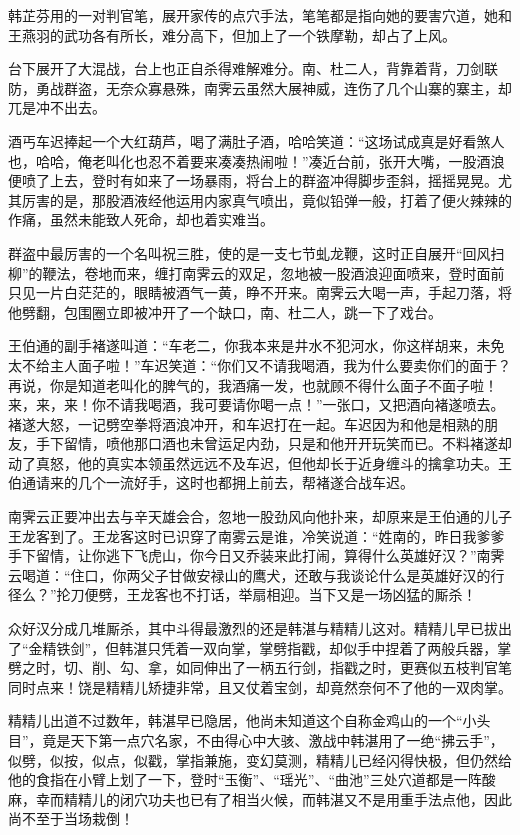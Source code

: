 \documentclass[12pt,oneside]{book}
\begin{document}
韩芷芬用的一对判官笔，展开家传的点穴手法，笔笔都是指向她的要害穴道，她和王燕羽的武功各有所长，难分高下，但加上了一个铁摩勒，却占了上风。

台下展开了大混战，台上也正自杀得难解难分。南、杜二人，背靠着背，刀剑联防，勇战群盗，无奈众寡悬殊，南霁云虽然大展神威，连伤了几个山寨的寨主，却兀是冲不出去。

酒丐车迟捧起一个大红葫芦，喝了满肚子酒，哈哈笑道：``这场试成真是好看煞人也，哈哈，俺老叫化也忍不着要来凑凑热闹啦！''凑近台前，张开大嘴，一股酒浪便喷了上去，登时有如来了一场暴雨，将台上的群盗冲得脚步歪斜，摇摇晃晃。尤其厉害的是，那股酒液经他运用内家真气喷出，竟似铅弹一般，打着了便火辣辣的作痛，虽然未能致人死命，却也着实难当。

群盗中最厉害的一个名叫祝三胜，使的是一支七节虬龙鞭，这时正自展开``回风扫柳''的鞭法，卷地而来，缠打南霁云的双足，忽地被一股酒浪迎面喷来，登时面前只见一片白茫茫的，眼睛被酒气一黄，睁不开来。南霁云大喝一声，手起刀落，将他劈翻，包围圈立即被冲开了一个缺口，南、杜二人，跳一下了戏台。

王伯通的副手褚遂叫道：``车老二，你我本来是井水不犯河水，你这样胡来，未免太不给主人面子啦！''车迟笑道：``你们又不请我喝酒，我为什么要卖你们的面于？再说，你是知道老叫化的脾气的，我酒痛一发，也就顾不得什么面子不面子啦！来，来，来！你不请我喝酒，我可要请你喝一点！''一张口，又把酒向褚遂喷去。褚遂大怒，一记劈空拳将酒浪冲开，和车迟打在一起。车迟因为和他是相熟的朋友，手下留情，喷他那口酒也未曾运足内劲，只是和他开开玩笑而已。不料褚遂却动了真怒，他的真实本领虽然远远不及车迟，但他却长于近身缠斗的擒拿功夫。王伯通请来的几个一流好手，这时也都拥上前去，帮褚遂合战车迟。

南霁云正要冲出去与辛天雄会合，忽地一股劲风向他扑来，却原来是王伯通的儿子王龙客到了。王龙客这时已识穿了南雾云是谁，冷笑说道：``姓南的，昨日我爹爹手下留情，让你逃下飞虎山，你今日又乔装来此打闹，算得什么英雄好汉？''南霁云喝道：``住口，你两父子甘做安禄山的鹰犬，还敢与我谈论什么是英雄好汉的行径么？''抡刀便劈，王龙客也不打话，举扇相迎。当下又是一场凶猛的厮杀！

众好汉分成几堆厮杀，其中斗得最激烈的还是韩湛与精精儿这对。精精儿早已拔出了``金精铁剑''，但韩湛只凭着一双向掌，掌劈指戳，却似手中捏着了两般兵器，掌劈之时，切、削、勾、拿，如同伸出了一柄五行剑，指戳之时，更赛似五枝判官笔同时点来！饶是精精儿矫捷非常，且又仗着宝剑，却竟然奈何不了他的一双肉掌。

精精儿出道不过数年，韩湛早已隐居，他尚未知道这个自称金鸡山的一个``小头目''，竟是天下第一点穴名家，不由得心中大骇、激战中韩湛用了一绝``拂云手''，似劈，似按，似点，似戳，掌指兼施，变幻莫测，精精儿已经闪得快极，但仍然给他的食指在小臂上划了一下，登时``玉衡''、``瑶光''、``曲池''三处穴道都是一阵酸麻，幸而精精儿的闭穴功夫也已有了相当火候，而韩湛又不是用重手法点他，因此尚不至于当场栽倒！
\end{document}
